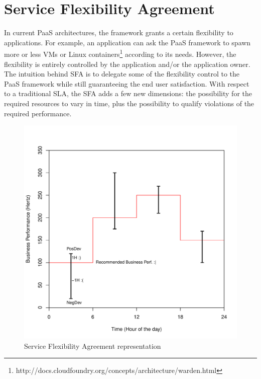\section{Service Flexibility Agreement}
\label{sec:sfa}

In current PaaS architectures, the framework grants a certain flexibility to applications.
For example, an application can ask the PaaS framework to spawn more or less VMs or Linux containers\footnote{http://docs.cloudfoundry.org/concepts/architecture/warden.html} according to its needs.
However, the flexibility is entirely controlled by the application and/or the application owner.
The intuition behind SFA is to delegate some of the flexibility control to the PaaS framework while still guaranteeing the end user satisfaction.
With respect to a traditional SLA, the SFA adds a few new dimensions: the possibility for the required resources to vary in time, plus the possibility to qualify violations of the required performance.

\begin{figure}[h]
\centering
\includegraphics[width=0.6\linewidth]{generated/SFA-candles.pdf}
\caption{Service Flexibility Agreement representation}
\label{fig:SFA}
\end{figure}


